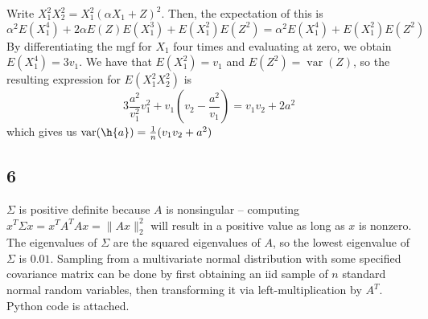 \documentclass{article}
\newcommand{\openm}{\begin{pmatrix}}
\newcommand{\closem}{\end{pmatrix}}
\DeclareMathOperator{\var}{var}
\begin{document}
%
Write $X_1^2X_2^2=X_1^2(\alpha X_1+Z)^2$. Then, the expectation of this is
\[\alpha^2E(X_1^4)+2\alpha E(Z)E(X_1^3)+E(X_1^2)E(Z^2)=\alpha^2E(X_1^4)+E(X_1^2)E(Z^2)\]
By differentiating the mgf for $X_1$ four times and evaluating at zero, we obtain $E(X_1^4)=3v_1$. We have that $E(X_1^2)=v_1$ and $E(Z^2)=\var(Z)$, so the resulting expression for $E(X_1^2X_2^2)$ is
\[3\frac{a^2}{v_1^2}v_1^2+v_1\left(v_2-\frac{a^2}{v_1}\right)=v_1v_2+2a^2\]
which gives us $\var(\h{a})=\frac{1}{n}(v_1v_2+a^2)$
\subsection*{6}
$\Sigma$ is positive definite because $A$ is nonsingular -- computing $x^T\Sigma x=x^TA^TAx=\|Ax\|_2^2$ will result in a positive value as long as $x$ is nonzero. The eigenvalues of $\Sigma$ are the squared eigenvalues of $A$, so the lowest eigenvalue of $\Sigma$ is $0.01$.
Sampling from a multivariate normal distribution with some specified covariance matrix can be done by first obtaining an iid sample of $n$ standard normal random variables, then transforming it via left-multiplication by $A^T$. Python code is attached.
\end{document}
